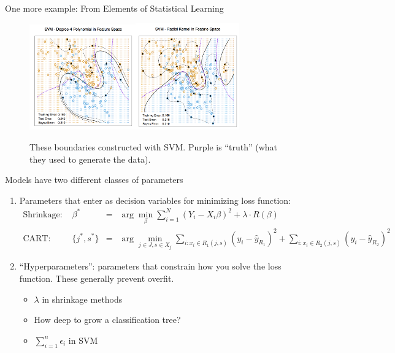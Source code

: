 \documentclass[mathserif, aspectratio=169]{beamer}
\begin{document}
\begin{frame}{One more example: From Elements of Statistical Learning}

	\begin{figure}
		\includegraphics[width=0.4075\textwidth]{ESL_12_3a}\includegraphics[width=0.4\textwidth]{ESL_12_3b}
		\caption*{These boundaries constructed with SVM. Purple is ``truth'' (what they used to generate the data).  }
	\end{figure}

\end{frame}

\begin{frame}{Models have two different classes of parameters}
	\begin{enumerate}
		\item Parameters that enter as decision variables for minimizing loss function:
		\begin{align*}
			\text{Shrinkage: } & \beta^*  &=& \arg \min_\beta \sum_{i=1}^N \left(Y_i - X_i \beta \right)^2+\lambda \cdot R(\beta)\\
			\text{CART: } & \{j^*,s^*\}  &=& \arg \min_{j\in J, s\in X_j} \sum_{i:x_i\in R_1(j,s)} (y_i-\hat{y}_{R_1})^2 + \sum_{i:x_i\in R_2(j,s)} (y_i-\hat{y}_{R_2})^2
		\end{align*}
		\item ``Hyperparameters'': parameters that constrain how you solve the loss function.  These generally prevent overfit.
		\begin{itemize} \pause
			\item $\lambda$ in shrinkage methods
			\item How deep to grow a classification tree?
			\item $\sum_{i=1}^n \epsilon_i$ in SVM
		\end{itemize}
	\end{enumerate}
	
\end{frame}
\end{document}
